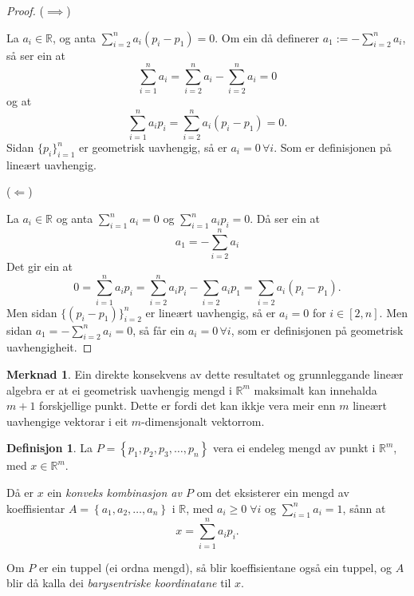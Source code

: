 \documentclass[a4paper, 12pt, norsk]{article}
\theoremstyle{plain}
\theoremstyle{definition}
\newtheorem{definition}[theorem]{Definisjon}
\newtheorem{remark}[theorem]{Merknad}
\newcommand{\Rb}{\mathbb{R}}
\newcommand{\set}[1]{ \left\{ #1 \right\} } %
\begin{document}
\begin{proof}
	($\implies$)
		
	La $a_i\in\Rb$, og anta $\sum_{i=2}^na_i(p_i-p_1)=0$. Om ein då definerer $a_1 := -\sum_{i=2}^na_i$, så ser ein at
	\begin{equation*}
		\sum_{i=1}^na_i=\sum_{i=2}^na_i-\sum_{i=2}^na_i=0
	\end{equation*}
	og at 
	\begin{equation*}
		\sum_{i=1}^na_ip_i=\sum_{i=2}^na_i(p_i-p_1)=0.
	\end{equation*}
	Sidan $\{p_i\}_{i=1}^n$ er geometrisk uavhengig, så er $a_i=0 \, \forall i$. Som er definisjonen på lineært uavhengig.
	
	(\(\Longleftarrow\))
	
	La $a_i\in\Rb$ og anta $\sum_{i=1}^n a_i=0$ og $\sum_{i=1}^n a_ip_i=0$. Då ser ein at 
	\begin{equation*}
		a_1=-\sum_{i=2}^n a_i
	\end{equation*} 
	Det gir ein at
	\begin{equation*}
		0=\sum_{i=1}^n a_ip_i=\sum_{i=2}^n a_ip_i-\sum_{i=2}a_ip_1=\sum_{i=2}a_i(p_i-p_1).
	\end{equation*}
	Men sidan $\{(p_i-p_1)\}_{i=2}^n$ er lineært uavhengig, så er $ a_i = 0$ for $i\in[2,n]$. Men sidan $a_1 = -\sum_{i=2}^n a_i=0$, så får ein $a_i=0 \, \forall i$, som er definisjonen på geometrisk uavhengigheit.
\end{proof}

\begin{remark}
	Ein direkte konsekvens av dette resultatet og grunnleggande lineær algebra er at ei geometrisk uavhengig mengd i $\Rb^m$ maksimalt kan innehalda $m+1$ forskjellige punkt. Dette er fordi det kan ikkje vera meir enn $m$ lineært uavhengige vektorar i eit $m$-dimensjonalt vektorrom.
\end{remark}

\begin{definition}
	La \( P = \set{p_1, p_2, p_3, \dots, p_n} \) vera ei endeleg mengd av punkt i \( \Rb^m \), med \( x\in\Rb^m \).

	Då er \( x \) ein \emph{konveks kombinasjon av \( P \)} om det eksisterer ein mengd av koeffisientar \( A=\set{a_1, a_2, \dots, a_n} \) i \( \Rb \), med \( a_i \geq 0 \; \forall i \) og \( \sum_{i=1}^n a_i = 1 \), sånn at
	\[
		x=\sum_{i=1}^n a_ip_i.
	\]
	
	Om $P$ er ein tuppel (ei ordna mengd), så blir koeffisientane også ein tuppel, og $A$ blir då kalla dei \emph{barysentriske koordinatane} til $x$.
\end{definition}
\end{document}
